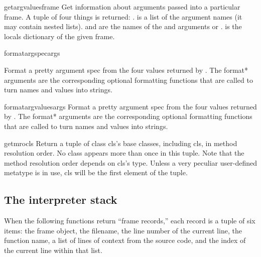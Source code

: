\begin{funcdesc}{getargvalues}{frame}
  Get information about arguments passed into a particular frame.
  A tuple of four things is returned: .
   is a list of the argument names (it may contain nested
  lists).
   and  are the names of the \code{*} and
  \code{**} arguments or .
   is the locals dictionary of the given frame.
\end{funcdesc}

\begin{funcdesc}{formatargspec}{args}

  Format a pretty argument spec from the four values returned by
  .  The format* arguments are the
  corresponding optional formatting functions that are called to turn
  names and values into strings.
\end{funcdesc}

\begin{funcdesc}{formatargvalues}{args}
  Format a pretty argument spec from the four values returned by
  .  The format* arguments are the
  corresponding optional formatting functions that are called to turn
  names and values into strings.
\end{funcdesc}

\begin{funcdesc}{getmro}{cls}
  Return a tuple of class cls's base classes, including cls, in
  method resolution order.  No class appears more than once in this tuple.
  Note that the method resolution order depends on cls's type.  Unless a
  very peculiar user-defined metatype is in use, cls will be the first
  element of the tuple.
\end{funcdesc}

\subsection{The interpreter stack
            \label{inspect-stack}}

When the following functions return ``frame records,'' each record
is a tuple of six items: the frame object, the filename,
the line number of the current line, the function name, a list of
lines of context from the source code, and the index of the current
line within that list.

